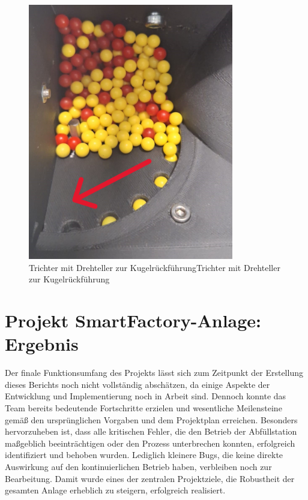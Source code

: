 \begin{figure}[h!] %
    \centering  
    \includegraphics[width=0.8\textwidth]{figures/b15ba5c8-ba29-495a-9e40-18a8cdfba58f.PNG}
    \caption{Trichter mit Drehteller zur KugelrückführungTrichter mit Drehteller zur Kugelrückführung\cite{siemens2022}} 
    \label{fig:Trichter mit Drehteller zur Kugelrückführung} %
    \vspace{0.5em} %
    \small %
\end{figure}

\section{Projekt SmartFactory-Anlage: Ergebnis}\label{sec:Projekt_SmartFactory-Anlage:_Ergebnis}

Der finale Funktionsumfang des Projekts lässt sich zum Zeitpunkt der Erstellung dieses Berichts noch nicht vollständig abschätzen, da einige 
Aspekte der Entwicklung und Implementierung noch in Arbeit sind. Dennoch konnte das Team bereits bedeutende Fortschritte erzielen und wesentliche 
Meilensteine gemäß den ursprünglichen Vorgaben und dem Projektplan erreichen. Besonders hervorzuheben ist, dass alle kritischen Fehler, die den 
Betrieb der Abfüllstation maßgeblich beeinträchtigen oder den Prozess unterbrechen konnten, erfolgreich identifiziert und behoben wurden. 
Lediglich kleinere Bugs, die keine direkte Auswirkung auf den kontinuierlichen Betrieb haben, verbleiben noch zur Bearbeitung. Damit wurde 
eines der zentralen Projektziele, die Robustheit der gesamten Anlage erheblich zu steigern, erfolgreich realisiert.

